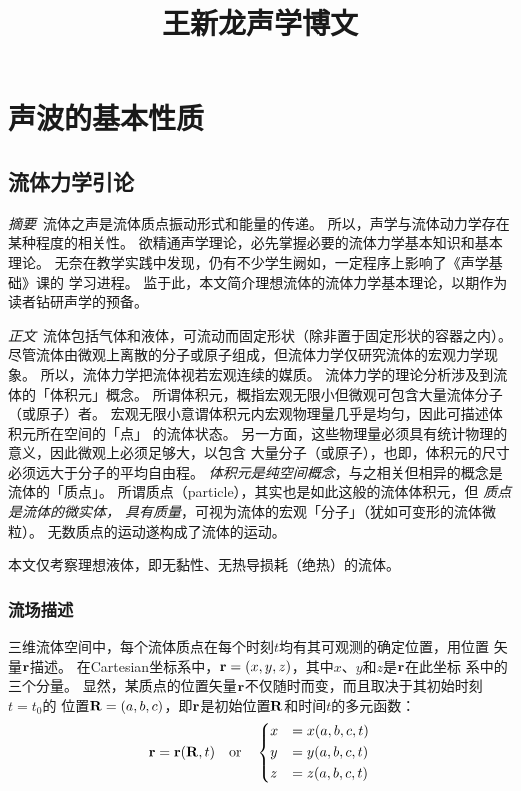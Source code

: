 \documentclass[UTF8]{ctexbook}
\title{王新龙声学博文}
\let\stdsection\section
\renewcommand\section{\newpage\stdsection}
\begin{document}
\maketitle

\tableofcontents

\chapter{声波的基本性质}
\section{流体力学引论}

\emph{摘要}\ 流体之声是流体质点振动形式和能量的传递。
所以，声学与流体动力学存在某种程度的相关性。
欲精通声学理论，必先掌握必要的流体力学基本知识和基本理论。
无奈在教学实践中发现，仍有不少学生阙如，一定程序上影响了《声学基础》课的
学习进程。
监于此，本文简介理想流体的流体力学基本理论，以期作为读者钻研声学的预备。

\emph{正文}\ 流体包括气体和液体，可流动而固定形状（除非置于固定形状的容器之内）。
尽管流体由微观上离散的分子或原子组成，但流体力学仅研究流体的宏观力学现象。
所以，流体力学把流体视若宏观连续的媒质。
流体力学的理论分析涉及到流体的「体积元」概念。
所谓体积元，概指宏观无限小但微观可包含大量流体分子（或原子）者。
宏观无限小意谓体积元内宏观物理量几乎是均匀，因此可描述体积元所在空间的「点」
的流体状态。
另一方面，这些物理量必须具有统计物理的意义，因此微观上必须足够大，以包含
大量分子（或原子），也即，体积元的尺寸必须远大于分子的平均自由程。
\emph{体积元是纯空间概念}，与之相关但相异的概念是流体的「质点」。
所谓质点（particle），其实也是如此这般的流体体积元，但\emph{
	质点是流体的微实体，
具有质量}，可视为流体的宏观「分子」（犹如可变形的流体微粒）。
无数质点的运动遂构成了流体的运动。

本文仅考察理想液体，即无黏性、无热导损耗（绝热）的流体。

\subsection{流场描述}
三维流体空间中，每个流体质点在每个时刻$t$均有其可观测的确定位置，用位置
矢量$\vb{r}$描述。
在Cartesian坐标系中，$\vb{r}=(x,y,z)$，其中$x$、$y$和$z$是$\vb{r}$在此坐标
系中的三个分量。
显然，某质点的位置矢量$\vb{r}$不仅随时而变，而且取决于其初始时刻$t=t_0$的
位置$\vb{R}=(a,b,c)$，即$\vb{r}$是初始位置$\vb{R}$和时间$t$的多元函数：
\begin{equation}
	\vb{r} = \vb{r}(\vb{R},t)\qor 
	\begin{dcases}
		x&=x(a,b,c,t)\\
		y&=y(a,b,c,t)\\
		z&=z(a,b,c,t)
	\end{dcases}
\end{equation}
\end{document}
